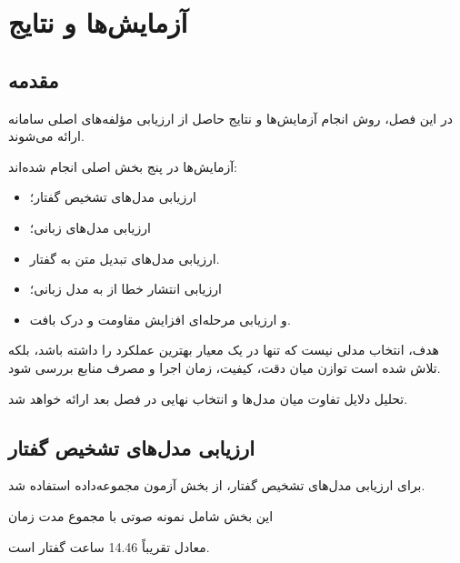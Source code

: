 
\chapter{آزمایش‌ها و نتایج}

\section{مقدمه}

در این فصل، روش انجام آزمایش‌ها و نتایج حاصل از ارزیابی
مؤلفه‌های اصلی سامانه ارائه می‌شوند.

آزمایش‌ها در پنج بخش اصلی انجام شده‌اند:

\begin{itemize}
    \item ارزیابی مدل‌های تشخیص گفتار؛
    \item ارزیابی مدل‌های زبانی؛
    \item ارزیابی مدل‌های تبدیل متن به گفتار.
    \item ارزیابی انتشار خطا از  به مدل زبانی؛
    \item و ارزیابی مرحله‌ای افزایش مقاومت و درک بافت.
\end{itemize}

هدف، انتخاب مدلی نیست که تنها در یک معیار بهترین عملکرد را
داشته باشد، بلکه تلاش شده است توازن میان دقت، کیفیت،
زمان اجرا و مصرف منابع بررسی شود.

تحلیل دلایل تفاوت میان مدل‌ها و انتخاب نهایی در فصل بعد
ارائه خواهد شد.


\section{ارزیابی مدل‌های تشخیص گفتار}

برای ارزیابی مدل‌های تشخیص گفتار، از بخش آزمون
مجموعه‌داده
استفاده شد.

این بخش شامل
نمونه صوتی با مجموع مدت زمان

\begin{center}
\end{center}

معادل تقریباً 14.46 ساعت گفتار است.

